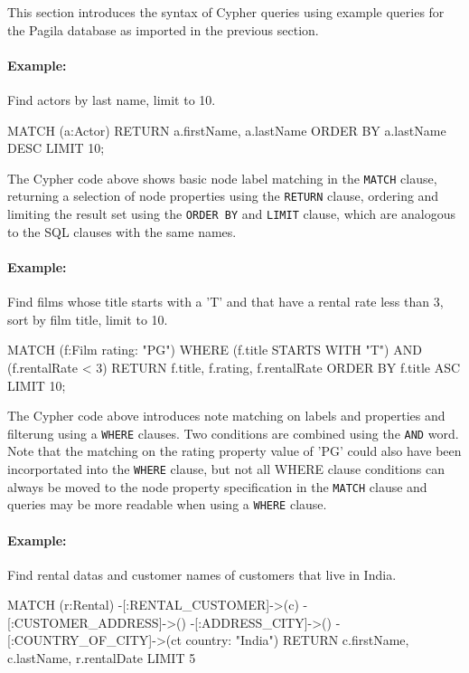 This section introduces the syntax of Cypher queries using example queries for the Pagila database as imported in the previous section.

\paragraph*{Example:}
Find actors by last name, limit to 10.

\begin{cyphercode}
MATCH (a:Actor) 
RETURN a.firstName, a.lastName
ORDER BY a.lastName DESC
LIMIT 10;
\end{cyphercode}

The Cypher code above shows basic node label matching in the \texttt{MATCH} clause, returning a selection of node properties using the \texttt{RETURN} clause, ordering and limiting the result set using the \texttt{ORDER BY} and \texttt{LIMIT} clause, which are analogous to the SQL clauses with the same names.

\paragraph*{Example:} Find films whose title starts with a 'T' and that have a rental rate less than 3, sort by film title, limit to 10.

\begin{cyphercode}
MATCH (f:Film {rating: "PG"})
WHERE (f.title STARTS WITH "T") AND (f.rentalRate < 3)
RETURN f.title, f.rating, f.rentalRate
ORDER BY f.title ASC LIMIT 10;
\end{cyphercode}

The Cypher code above introduces note matching on labels and properties and filterung using a \texttt{WHERE} clauses. Two conditions are combined using the \texttt{AND} word. Note that the matching on the rating property value of 'PG' could also have been incorportated into the \texttt{WHERE} clause, but not all WHERE clause conditions can always be moved to the node property specification in the \texttt{MATCH} clause and queries may be more readable when using a \texttt{WHERE} clause. 

\paragraph*{Example:} Find rental datas and customer names of customers that live in India.

\begin{cyphercode}
MATCH (r:Rental) 
        -[:RENTAL_CUSTOMER]->(c) 
        -[:CUSTOMER_ADDRESS]->() 
        -[:ADDRESS_CITY]->()
        -[:COUNTRY_OF_CITY]->(ct {country: "India"})
RETURN c.firstName, c.lastName, r.rentalDate LIMIT 5
\end{cyphercode}

